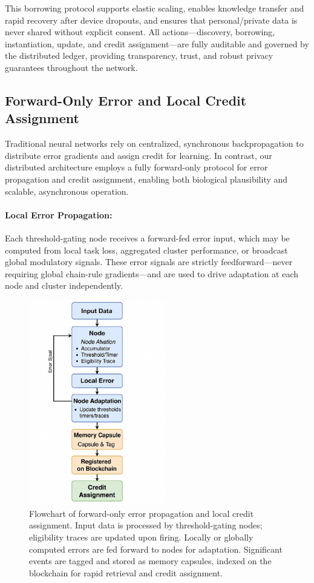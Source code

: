 \documentclass[11pt]{article}
\begin{document}
This borrowing protocol supports elastic scaling, enables knowledge transfer and rapid recovery after device dropouts, and ensures that personal/private data is never shared without explicit consent. All actions—discovery, borrowing, instantiation, update, and credit assignment—are fully auditable and governed by the distributed ledger, providing transparency, trust, and robust privacy guarantees throughout the network.

\subsection{Forward-Only Error and Local Credit Assignment}

Traditional neural networks rely on centralized, synchronous backpropagation to distribute error gradients and assign credit for learning. In contrast, our distributed architecture employs a fully forward-only protocol for error propagation and credit assignment, enabling both biological plausibility and scalable, asynchronous operation.

\paragraph{Local Error Propagation:}
Each threshold-gating node receives a forward-fed error input, which may be computed from local task loss, aggregated cluster performance, or broadcast global modulatory signals. These error signals are strictly feedforward—never requiring global chain-rule gradients—and are used to drive adaptation at each node and cluster independently.

\begin{figure}[ht]
    \centering
    \includegraphics[width=0.53\textwidth]{architecture_diagrams/flowchart-credit-assignment.png}
    \caption{
        Flowchart of forward-only error propagation and local credit assignment. Input data is processed by threshold-gating nodes; eligibility traces are updated upon firing. Locally or globally computed errors are fed forward to nodes for adaptation. Significant events are tagged and stored as memory capsules, indexed on the blockchain for rapid retrieval and credit assignment.
    }
    \label{fig:forward-error-credit-flow}
\end{figure}
\end{document}
